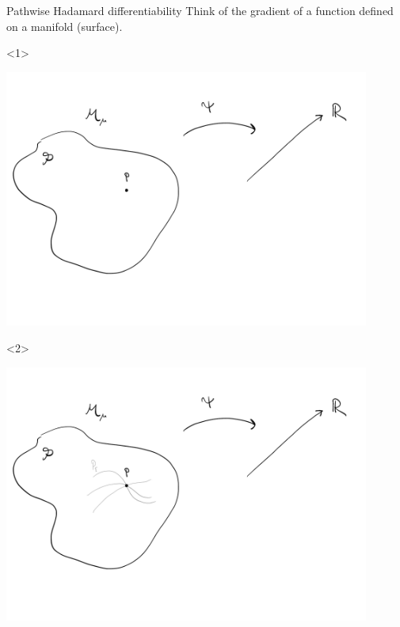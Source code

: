 \documentclass{beamer}\usepackage{listings}
\begin{document}
\begin{frame}[label={sec:org409d0ac}]{Pathwise Hadamard differentiability}
Think of the gradient of a function defined on a manifold (surface).

\begin{onlyenv}<1>
\begin{center}
\includegraphics[width=0.9\textwidth]{./figures/Pathwise-derivative0.pdf}
\end{center}
\end{onlyenv}

\begin{onlyenv}<2>
\begin{center}
\includegraphics[width=0.9\textwidth]{./figures/Pathwise-derivative1.pdf}
\end{center}
\end{onlyenv}


\end{frame}
\end{document}
